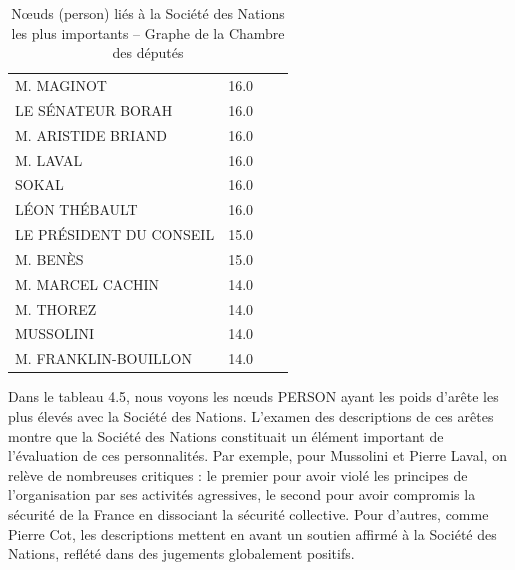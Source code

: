 \documentclass[a4paper,twoside,12pt]{book}
\begin{document}
\begin{table}[htbp]
\begin{tabular}{ll@{\hskip 1cm}ll}
M. MAGINOT & 16.0 \\
LE SÉNATEUR BORAH & 16.0 \\
M. ARISTIDE BRIAND & 16.0 \\
M. LAVAL & 16.0 \\
SOKAL & 16.0 \\
LÉON THÉBAULT & 16.0 \\
LE PRÉSIDENT DU CONSEIL & 15.0 \\
M. BENÈS & 15.0 \\
M. MARCEL CACHIN & 14.0 \\
M. THOREZ & 14.0 \\
MUSSOLINI & 14.0 \\
M. FRANKLIN-BOUILLON & 14.0 \\
\hline
\end{tabular}
\caption{Nœuds (person) liés à la Société des Nations les plus importants – Graphe de la Chambre des députés}
\end{table}

Dans le tableau 4.5, nous voyons les nœuds PERSON ayant les poids d'arête les plus élevés avec la Société des Nations. L'examen des descriptions de ces arêtes montre que la Société des Nations constituait un élément important de l'évaluation de ces personnalités. Par exemple, pour Mussolini et Pierre Laval, on relève de nombreuses critiques : le premier pour avoir violé les principes de l'organisation par ses activités agressives, le second pour avoir compromis la sécurité de la France en dissociant la sécurité collective. Pour d'autres, comme Pierre Cot, les descriptions mettent en avant un soutien affirmé à la Société des Nations, reflété dans des jugements globalement positifs.
\end{document}
